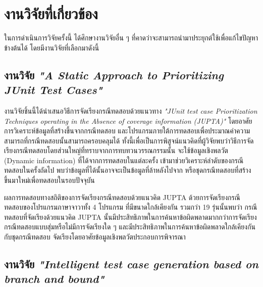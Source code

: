 \section{งานวิจัยที่เกี่ยวข้อง} 

ในการดำเนินการวิจัยครั้งนี้ ได้ศึกษางานวิจัยอื่น ๆ ที่คาดว่าจะสามารถนำมาประยุกต์ใช้เพื่อแก้ไขปัญหาข้างต้นได้ โดยมีงานวิจัยที่เลือกมาดังนี้

\subsection{งานวิจัย {\it "A Static Approach to Prioritizing JUnit Test Cases"} \cite{6363461}}

งานวิจัยชิ้นนี้ได้นำเสนอวิธีการจัดเรียงกรณีทดสอบด้วยแนวทาง \emph{"JUnit test case Prioritization Techniques operating in the Absence of coverage information (JUPTA)"} 
โดยอาศัยการวิเคราะห์ข้อมูล{\scg}ที่สร้างขึ้นจากกรณีทดสอบ และโปรแกรมภายใต้การทดสอบเพื่อประมาณค่าความสามารถที่กรณีทดสอบนั้นสามารถครอบคลุม{\sourcecode}ได้
ทั้งนี้เพื่อเป็นการพิสูจน์แนวคิดที่ผู้วิจัยพบว่าวิธีการจัดเรียงกรณีทดสอบโดยส่วนใหญ่ที่ทราบจากการทบทวนวรรณกรรมนั้น จะใช้ข้อมูลเชิงพลวัต (Dynamic information)
ที่ได้จากการทดสอบ{\sourcecode}ในแต่ละครั้ง เข้ามาช่วยวิเคราะห์ลำดับของกรณีทดสอบในครั้งถัดไป พบว่าข้อมูลที่ได้นั้นอาจจะเป็นข้อมูลที่ล้าหลังไปจาก{\sourcecode} 
หรือชุดกรณีทดสอบที่สร้างขึ้นมาใหม่เพื่อทดสอบในรอบปัจจุบัน 

ผลการทดสอบทางสถิติของการจัดเรียงกรณีทดสอบด้วยแนวคิด JUPTA ด้วยการจัดเรียงกรณีทดสอบของโปรแกรมภาษาจาวาทั้ง 4 โปรแกรม ที่มีขนาดใกล้เคียงกัน
รวมกว่า 19 รุ่นนั้นพบว่า กรณีทดสอบที่จัดเรียงด้วยแนวคิด JUPTA นั้นมีประสิทธิภาพในการค้นหาข้อผิดพลาดมากกว่าการจัดเรียงกรณีทดสอบแบบสุ่มหรือไม่มีการจัดเรียงใด ๆ 
และมีประสิทธิภาพในการค้นหาข้อผิดพลาดใกล้เคียงกันกับชุดกรณีทดสอบ จัดเรียงโดยอาศัยข้อมูลเชิงพลวัตประกอบการพิจารณา

\subsection{งานวิจัย {\it "Intelligent test case generation based on branch and bound"} \cite{XING201491}}
\label{sec:sub:bandb}


